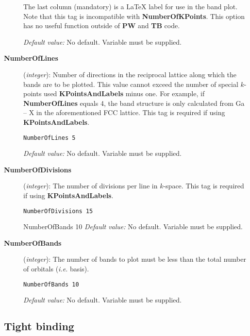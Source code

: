\begin{description}
The last column (mandatory) is a LaTeX label for use in the band
plot. Note that this tag is incompatible with {\bf
NumberOfKPoints}. This option has no useful function outside of
{\bf PW} and {\bf TB} code.

{\it Default value:} No default.  Variable must be supplied.

\item[{\bf NumberOfLines}] ({\it integer}):  Number of directions in the reciprocal lattice along
which the bands are to be plotted. This value cannot exceed the number
of special $k$-points used {\bf KPointsAndLabels} minus one. For
example, if {\bf NumberOfLines} equals 4, the band structure is only
calculated from Ga -- X in the aforementioned FCC lattice. This tag
is required if using {\bf KPointsAndLabels}.

\begin{verbatim}
NumberOfLines 5
\end{verbatim}

 {\it Default
value:} No default.  Variable must be supplied.

\item[{\bf NumberOfDivisions}] ({\it integer}):
The number of divisions per line in $k$-space. This tag is required if
using {\bf KPointsAndLabels}.

\begin{verbatim}
NumberOfDivisions 15
\end{verbatim}
NumberOfBands 10
 {\it Default value:} No
default.  Variable must be supplied.

\item[{\bf NumberOfBands}] ({\it integer}):
The number of bands to plot must be less than the total number of
orbitals ({\it i.e.} basis).

\begin{verbatim}
NumberOfBands 10
\end{verbatim}

 {\it Default value:} No default.  Variable must
be supplied.

\end{description}

\subsection{Tight binding}

